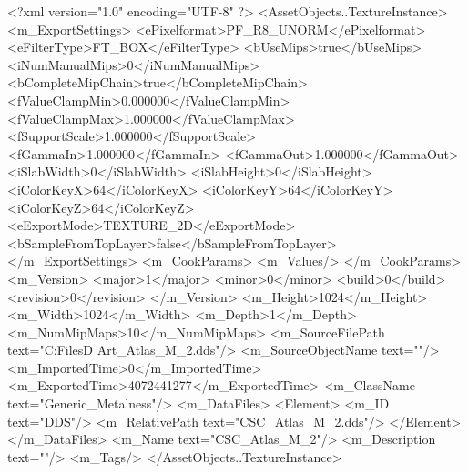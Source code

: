 <?xml version="1.0" encoding="UTF-8" ?>
<AssetObjects..TextureInstance>
	<m_ExportSettings>
		<ePixelformat>PF_R8_UNORM</ePixelformat>
		<eFilterType>FT_BOX</eFilterType>
		<bUseMips>true</bUseMips>
		<iNumManualMips>0</iNumManualMips>
		<bCompleteMipChain>true</bCompleteMipChain>
		<fValueClampMin>0.000000</fValueClampMin>
		<fValueClampMax>1.000000</fValueClampMax>
		<fSupportScale>1.000000</fSupportScale>
		<fGammaIn>1.000000</fGammaIn>
		<fGammaOut>1.000000</fGammaOut>
		<iSlabWidth>0</iSlabWidth>
		<iSlabHeight>0</iSlabHeight>
		<iColorKeyX>64</iColorKeyX>
		<iColorKeyY>64</iColorKeyY>
		<iColorKeyZ>64</iColorKeyZ>
		<eExportMode>TEXTURE_2D</eExportMode>
		<bSampleFromTopLayer>false</bSampleFromTopLayer>
	</m_ExportSettings>
	<m_CookParams>
		<m_Values/>
	</m_CookParams>
	<m_Version>
		<major>1</major>
		<minor>0</minor>
		<build>0</build>
		<revision>0</revision>
	</m_Version>
	<m_Height>1024</m_Height>
	<m_Width>1024</m_Width>
	<m_Depth>1</m_Depth>
	<m_NumMipMaps>10</m_NumMipMaps>
	<m_SourceFilePath text="C:\Users\Shadow\Desktop\Working Files\3D Art\Textures\CSC_Atlas_M_2.dds"/>
	<m_SourceObjectName text=""/>
	<m_ImportedTime>0</m_ImportedTime>
	<m_ExportedTime>4072441277</m_ExportedTime>
	<m_ClassName text="Generic_Metalness"/>
	<m_DataFiles>
		<Element>
			<m_ID text="DDS"/>
			<m_RelativePath text="CSC_Atlas_M_2.dds"/>
		</Element>
	</m_DataFiles>
	<m_Name text="CSC_Atlas_M_2"/>
	<m_Description text=""/>
	<m_Tags/>
</AssetObjects..TextureInstance>

